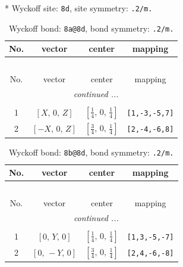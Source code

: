 \documentclass[fleqn,8pt]{jsarticle}
\begin{document}
* Wyckoff site: {\tt 8d}, site symmetry: {\tt .2/m.}
\renewcommand{\arraystretch}{1.2}
\begin{longtable}{cccc}
\caption{Wyckoff bond: {\tt 8a@8d}, bond symmetry: {\tt .2/m.}}
 \\
 \hline \hline
No. & vector & center & mapping \\ \hline \endfirsthead

\multicolumn{3}{l}{\tablename\ \thetable{}} \\
 \hline \hline
No. & vector & center & mapping \\ \hline \endhead

 \hline \hline
\multicolumn{3}{r}{\footnotesize\it continued ...} \\ \endfoot

 \hline \hline
\multicolumn{3}{r}{} \\ \endlastfoot

1 & $\left[ X,\, 0,\, Z \right]$ & $\left[ \frac{1}{4},\, 0,\, \frac{1}{4} \right]$ & {\tt [1,-3,-5,7]} \\ \hline
2 & $\left[ - X,\, 0,\, Z \right]$ & $\left[ \frac{3}{4},\, 0,\, \frac{1}{4} \right]$ & {\tt [2,-4,-6,8]} \\
\end{longtable}
\renewcommand{\arraystretch}{1.2}
\begin{longtable}{cccc}
\caption{Wyckoff bond: {\tt 8b@8d}, bond symmetry: {\tt .2/m.}}
 \\
 \hline \hline
No. & vector & center & mapping \\ \hline \endfirsthead

\multicolumn{3}{l}{\tablename\ \thetable{}} \\
 \hline \hline
No. & vector & center & mapping \\ \hline \endhead

 \hline \hline
\multicolumn{3}{r}{\footnotesize\it continued ...} \\ \endfoot

 \hline \hline
\multicolumn{3}{r}{} \\ \endlastfoot

1 & $\left[ 0,\, Y,\, 0 \right]$ & $\left[ \frac{1}{4},\, 0,\, \frac{1}{4} \right]$ & {\tt [1,3,-5,-7]} \\ \hline
2 & $\left[ 0,\, - Y,\, 0 \right]$ & $\left[ \frac{3}{4},\, 0,\, \frac{1}{4} \right]$ & {\tt [2,4,-6,-8]} \\
\end{longtable}
\renewcommand{\arraystretch}{1.2}
\end{document}
